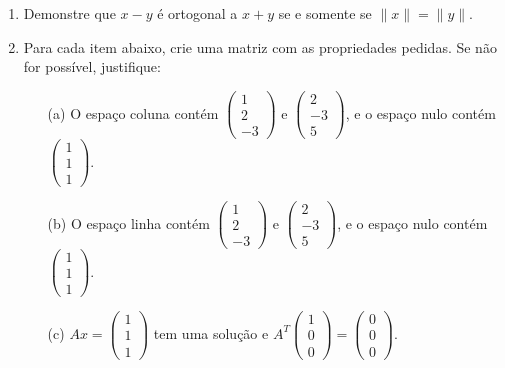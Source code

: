 \documentclass[12pt]{article}
\newcommand{\norm}[1]{\| #1 \|}
\begin{document}
\begin{enumerate}
   \item Demonstre que $x-y$ é ortogonal a $x+y$ se e somente se $\norm{x} = \norm{y}$.
   \item Para cada item abaixo, crie uma matriz com as propriedades pedidas. Se não for possível, justifique:
   \begin{itemize}
      \item[(a)] O espaço coluna contém $\begin{pmatrix} 1\\2\\-3\end{pmatrix}$ e $\begin{pmatrix}2\\-3\\5\end{pmatrix}$, e o espaço nulo contém $\begin{pmatrix}1\\1\\1\end{pmatrix}$.
      \item[(b)] O espaço linha contém $\begin{pmatrix}1\\2\\-3\end{pmatrix}$ e $\begin{pmatrix}2\\-3\\5\end{pmatrix}$, e o espaço nulo contém $\begin{pmatrix}1\\1\\1\end{pmatrix}$.
      \item[(c)] $Ax = \begin{pmatrix}1\\1\\1\end{pmatrix}$ tem uma solução e $A^T\begin{pmatrix}1\\0\\0\end{pmatrix} = \begin{pmatrix}0\\0\\0\end{pmatrix}$.

\end{itemize}
\end{enumerate}
\end{document}
